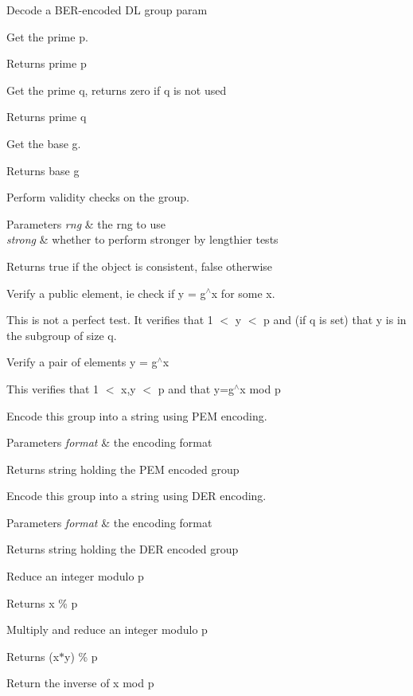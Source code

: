 Decode a B\+E\+R-\/encoded DL group param

Get the prime p. \begin{DoxyReturn}{Returns}
prime p
\end{DoxyReturn}
Get the prime q, returns zero if q is not used \begin{DoxyReturn}{Returns}
prime q
\end{DoxyReturn}
Get the base g. \begin{DoxyReturn}{Returns}
base g
\end{DoxyReturn}
Perform validity checks on the group. 
\begin{DoxyParams}{Parameters}
{\em rng} & the rng to use \\
\hline
{\em strong} & whether to perform stronger by lengthier tests \\
\hline
\end{DoxyParams}
\begin{DoxyReturn}{Returns}
true if the object is consistent, false otherwise
\end{DoxyReturn}
Verify a public element, ie check if y = g$^\wedge$x for some x.

This is not a perfect test. It verifies that 1 $<$ y $<$ p and (if q is set) that y is in the subgroup of size q.

Verify a pair of elements y = g$^\wedge$x

This verifies that 1 $<$ x,y $<$ p and that y=g$^\wedge$x mod p

Encode this group into a string using P\+EM encoding. 
\begin{DoxyParams}{Parameters}
{\em format} & the encoding format \\
\hline
\end{DoxyParams}
\begin{DoxyReturn}{Returns}
string holding the P\+EM encoded group
\end{DoxyReturn}
Encode this group into a string using D\+ER encoding. 
\begin{DoxyParams}{Parameters}
{\em format} & the encoding format \\
\hline
\end{DoxyParams}
\begin{DoxyReturn}{Returns}
string holding the D\+ER encoded group
\end{DoxyReturn}
Reduce an integer modulo p \begin{DoxyReturn}{Returns}
x \% p
\end{DoxyReturn}
Multiply and reduce an integer modulo p \begin{DoxyReturn}{Returns}
(x$\ast$y) \% p
\end{DoxyReturn}
Return the inverse of x mod p

